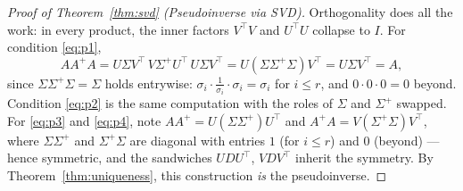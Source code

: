 \documentclass[12pt, a4paper]{article}
\theoremstyle{definition}
\begin{document}
\begin{proof}[Proof of Theorem~\ref{thm:svd} (Pseudoinverse via SVD)]
Orthogonality does all the work: in every product, the inner factors $V^\top V$ and $U^\top U$ collapse to $I$. For condition \eqref{eq:p1},
\[
    A A^+ A = U\Sigma V^\top \, V\Sigma^+ U^\top \, U\Sigma V^\top = U(\Sigma\Sigma^+\Sigma)V^\top = U\Sigma V^\top = A,
\]
since $\Sigma\Sigma^+\Sigma = \Sigma$ holds entrywise: $\sigma_i \cdot \tfrac{1}{\sigma_i} \cdot \sigma_i = \sigma_i$ for $i \leq r$, and $0 \cdot 0 \cdot 0 = 0$ beyond. Condition \eqref{eq:p2} is the same computation with the roles of $\Sigma$ and $\Sigma^+$ swapped. For \eqref{eq:p3} and \eqref{eq:p4}, note $AA^+ = U(\Sigma\Sigma^+)U^\top$ and $A^+A = V(\Sigma^+\Sigma)V^\top$, where $\Sigma\Sigma^+$ and $\Sigma^+\Sigma$ are diagonal with entries $1$ (for $i \leq r$) and $0$ (beyond) — hence symmetric, and the sandwiches $UDU^\top$, $VDV^\top$ inherit the symmetry. By Theorem~\ref{thm:uniqueness}, this construction \emph{is} the pseudoinverse.
\end{proof}
\end{document}
